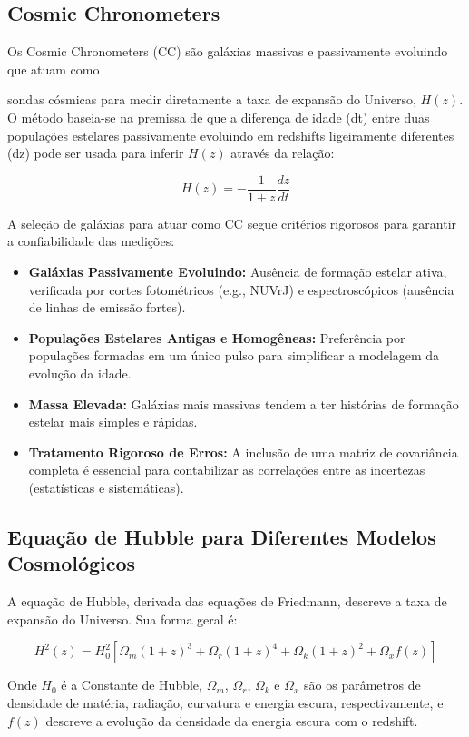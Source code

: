 \documentclass{article}
\begin{document}
\subsection{Cosmic Chronometers}

Os Cosmic Chronometers (CC) são galáxias massivas e passivamente evoluindo que atuam como 


sondas cósmicas para medir diretamente a taxa de expansão do Universo, $H(z)$. O método baseia-se na premissa de que a diferença de idade (dt) entre duas populações estelares passivamente evoluindo em redshifts ligeiramente diferentes (dz) pode ser usada para inferir $H(z)$ através da relação:

$$ H(z) = -\frac{1}{1+z} \frac{dz}{dt} $$

A seleção de galáxias para atuar como CC segue critérios rigorosos para garantir a confiabilidade das medições:
\begin{itemize}
    \item \textbf{Galáxias Passivamente Evoluindo:} Ausência de formação estelar ativa, verificada por cortes fotométricos (e.g., NUVrJ) e espectroscópicos (ausência de linhas de emissão fortes).
    \item \textbf{Populações Estelares Antigas e Homogêneas:} Preferência por populações formadas em um único pulso para simplificar a modelagem da evolução da idade.
    \item \textbf{Massa Elevada:} Galáxias mais massivas tendem a ter histórias de formação estelar mais simples e rápidas.
    \item \textbf{Tratamento Rigoroso de Erros:} A inclusão de uma matriz de covariância completa é essencial para contabilizar as correlações entre as incertezas (estatísticas e sistemáticas).
\end{itemize}

\subsection{Equação de Hubble para Diferentes Modelos Cosmológicos}

A equação de Hubble, derivada das equações de Friedmann, descreve a taxa de expansão do Universo. Sua forma geral é:

$$ H^2(z) = H_0^2 [\Omega_m (1+z)^3 + \Omega_r (1+z)^4 + \Omega_k (1+z)^2 + \Omega_x f(z)] $$

Onde $H_0$ é a Constante de Hubble, $\Omega_m$, $\Omega_r$, $\Omega_k$ e $\Omega_x$ são os parâmetros de densidade de matéria, radiação, curvatura e energia escura, respectivamente, e $f(z)$ descreve a evolução da densidade da energia escura com o redshift.
\end{document}
